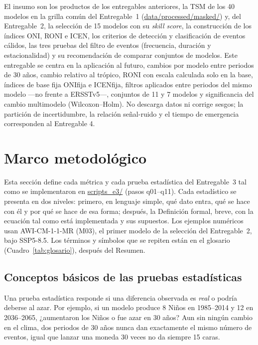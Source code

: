 \documentclass[11pt,a4paper]{article}
\newcommand{\archivo}[1]{\begingroup\hypersetup{urlcolor=black}\url{#1}\endgroup}
\begin{document}
El insumo son los productos de los entregables anteriores, la TSM de los 40 modelos en la grilla común del Entregable~1 (\archivo{data/processed/masked/}) y, del Entregable~2, la selección de 15 modelos con su \emph{skill score}, la construcción de los índices ONI, RONI e ICEN, los criterios de detección y clasificación de eventos cálidos, las tres pruebas del filtro de eventos (frecuencia, duración y estacionalidad) y su recomendación de comparar conjuntos de modelos. 
Este entregable se centra en la aplicación al futuro, cambios por modelo entre periodos de 30 años, cambio relativo al trópico, RONI con escala calculada solo en la base, índices de base fija ONIfija e ICENfija, filtros aplicados entre periodos del mismo modelo —no frente a ERSSTv5—, conjuntos de 11 y 7 modelos y significancia del cambio multimodelo (Wilcoxon–Holm). No descarga datos ni corrige sesgos; la partición de incertidumbre, la relación señal-ruido y el tiempo de emergencia corresponden al Entregable 4.

\section{Marco metodológico}
\label{sec:metodo}

Esta sección define cada métrica y cada prueba estadística del Entregable~3 tal como se implementaron en \archivo{scripts_e3/} (pasos q01--q11). Cada estadístico se presenta en dos niveles: primero, en lenguaje simple, qué dato entra, qué se hace con él y por qué se hace de esa forma; después, la Definición formal, breve, con la ecuación tal como está implementada y sus supuestos.
Los ejemplos numéricos usan AWI-CM-1-1-MR (M03), el primer modelo de la selección del Entregable~2, bajo SSP5-8.5. 
Los términos y símbolos que se repiten están en el glosario (Cuadro~\ref{tab:glosario}), después del Resumen.


\subsection{Conceptos básicos de las pruebas estadísticas}
\label{sec:conceptos}

Una prueba estadística responde si una diferencia observada es \emph{real} o podría deberse al azar. 
Por ejemplo, si un modelo produce 8 Niños en 1985--2014 y 12 en 2036--2065, ¿aumentaron los Niños o fue azar en 30 años? Aun sin ningún cambio en el clima, dos periodos de 30 años nunca dan exactamente el mismo número de eventos, igual que lanzar una moneda 30 veces no da siempre 15 caras.
\end{document}
